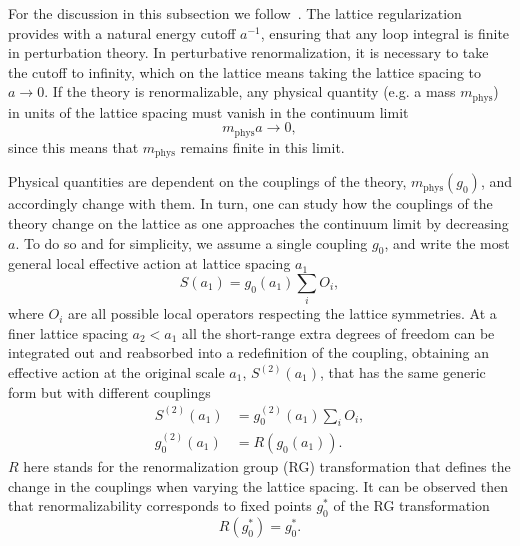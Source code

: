 For the discussion in this subsection we follow~\citep{Hernandez:2009zz}. The lattice regularization provides with a natural energy cutoff $a^{-1}$, ensuring that any loop integral is finite in perturbation theory. In perturbative renormalization, it is necessary to take the cutoff to infinity, which on the lattice means taking the lattice spacing to $a\rightarrow0$. If the theory is renormalizable, any physical quantity (e.g. a mass $m_{\textrm{phys}}$) in units of the lattice spacing must vanish in the continuum limit
\begin{equation}
\label{ch_foundation:eq:ma0}
m_{\textrm{phys}}a\rightarrow0,
\end{equation}
since this means that $m_{\textrm{phys}}$ remains finite in this limit. 

Physical quantities are dependent on the couplings of the theory, $m_{\textrm{phys}}(g_0)$, and accordingly change with them. In turn, one can study how the couplings of the theory change on the lattice as one approaches the continuum limit by decreasing $a$. To do so and for simplicity, we assume a single coupling $g_0$, and write the most general local effective action at lattice spacing $a_1$
\begin{equation}
S(a_1)=g_0(a_1)\sum_i{O}_i,
\end{equation}
where ${O}_i$ are all possible local operators respecting the lattice symmetries. At a finer lattice spacing $a_2<a_1$ all the short-range extra degrees of freedom can be integrated out and reabsorbed into a redefinition of the coupling, obtaining an effective action at the original scale $a_1$, $S^{(2)}(a_1)$, that has the same generic form but with different couplings
\begin{align}
S^{(2)}(a_1)&=g_0^{(2)}(a_1)\sum_iO_i, \\
g_0^{(2)}(a_1)&=R(g_0(a_1)).
\end{align}
$R$ here stands for the renormalization group (RG) transformation that defines the change in the couplings when varying the lattice spacing. It can be observed then that renormalizability corresponds to fixed points $g_0^*$ of the RG transformation
\begin{equation}
R(g_0^*)=g_0^*.
\end{equation}

